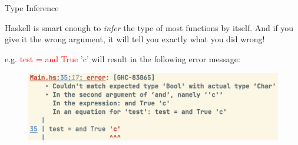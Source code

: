 \documentclass[pdf]{beamer}
\newcommand{\code}[1]{\textcolor{Red}{\textsf{#1}}}
\begin{document}
\begin{frame}[fragile]{Type Inference}
  \begin{figure}[H]
    \centering
    \hspace{0.1cm}
  \end{figure}
  Haskell is smart enough to \textit{infer} the type of most functions by itself. And if you give it the wrong argument, it will tell you exactly what you did wrong!

  e.g. \code{test = and True 'c'} will result in the following error message:
  \begin{figure}[H]
    \centering
    \includegraphics[width=\linewidth]{and-type-error}
  \end{figure}
\end{frame}
\end{document}
